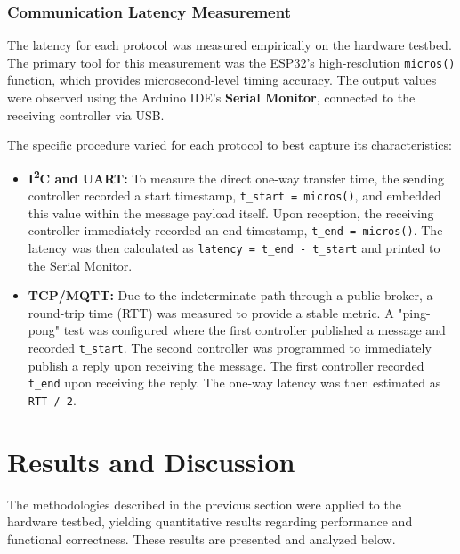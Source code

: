 \subsubsection{Communication Latency Measurement}
\label{subsubsec:latency_methodology}

The latency for each protocol was measured empirically on the hardware testbed. The primary tool for this measurement was the ESP32's high-resolution \texttt{micros()} function, which provides microsecond-level timing accuracy. The output values were observed using the Arduino IDE's \textbf{Serial Monitor}, connected to the receiving controller via USB.

The specific procedure varied for each protocol to best capture its characteristics:
\begin{itemize}
    \item \textbf{I\textsuperscript{2}C and UART:} To measure the direct one-way transfer time, the sending controller recorded a start timestamp, \texttt{t\_start = micros()}, and embedded this value within the message payload itself. Upon reception, the receiving controller immediately recorded an end timestamp, \texttt{t\_end = micros()}. The latency was then calculated as \texttt{latency = t\_end - t\_start} and printed to the Serial Monitor.

    \item \textbf{TCP/MQTT:} Due to the indeterminate path through a public broker, a round-trip time (RTT) was measured to provide a stable metric. A "ping-pong" test was configured where the first controller published a message and recorded \texttt{t\_start}. The second controller was programmed to immediately publish a reply upon receiving the message. The first controller recorded \texttt{t\_end} upon receiving the reply. The one-way latency was then estimated as \texttt{RTT / 2}.
\end{itemize}

\section{Results and Discussion}
\label{sec:results_and_discussion}

The methodologies described in the previous section were applied to the hardware testbed, yielding quantitative results regarding performance and functional correctness. These results are presented and analyzed below.

